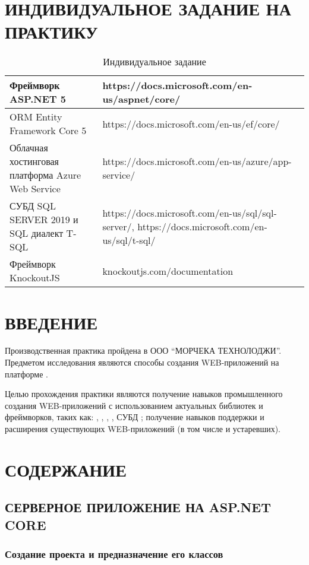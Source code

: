 \documentclass[a4paper,14pt]{extarticle}
\begin{document}
\section{ИНДИВИДУАЛЬНОЕ ЗАДАНИЕ НА ПРАКТИКУ}
\begin{table}[H]
    \caption{Индивидуальное задание}
    \begin{tabular}{ | p{5.5cm} | p{11cm} | }
        \hline
        Фреймворк ASP.NET 5 & https://docs.microsoft.com/en-us/aspnet/core/ \\ \hline
        ORM Entity Framework Core 5 & https://docs.microsoft.com/en-us/ef/core/ \\ \hline
        Облачная хостинговая платформа Azure Web Service & https://docs.microsoft.com/en-us/azure/app-service/ \\ \hline
        СУБД SQL SERVER 2019 и SQL диалект T-SQL & https://docs.microsoft.com/en-us/sql/sql-server/, https://docs.microsoft.com/en-us/sql/t-sql/ \\ \hline
        Фреймворк KnockoutJS & knockoutjs.com/documentation \\ \hline
    \end{tabular}
\end{table}
\pagebreak

\section{ВВЕДЕНИЕ}
Производственная практика пройдена в ООО \enquote{МОРЧЕКА ТЕХНОЛОДЖИ}. Предметом
исследования являются способы создания WEB-приложений на платформе .

Целью прохождения практики являются получение навыков промышленного создания
WEB-приложений с использованием актуальных библиотек и фреймворков, таких как:
, , , ,
СУБД ; получение навыков поддержки и расширения существующих
WEB-приложений (в том числе и устаревших).
\pagebreak

\tableofcontents
\pagebreak

\section{СОДЕРЖАНИЕ}
\subsection{СЕРВЕРНОЕ ПРИЛОЖЕНИЕ НА ASP.NET CORE}
\subsubsection{Создание проекта и предназначение его классов}
\end{document}
